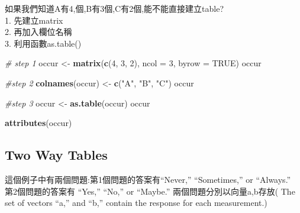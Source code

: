 \documentclass[]{book}
\newenvironment{Shaded}{\begin{snugshade}}{\end{snugshade}}
\newcommand{\CommentTok}[1]{\textcolor[rgb]{0.56,0.35,0.01}{\textit{#1}}}
\newcommand{\DataTypeTok}[1]{\textcolor[rgb]{0.13,0.29,0.53}{#1}}
\newcommand{\DecValTok}[1]{\textcolor[rgb]{0.00,0.00,0.81}{#1}}
\newcommand{\KeywordTok}[1]{\textcolor[rgb]{0.13,0.29,0.53}{\textbf{#1}}}
\newcommand{\NormalTok}[1]{#1}
\newcommand{\OtherTok}[1]{\textcolor[rgb]{0.56,0.35,0.01}{#1}}
\newcommand{\StringTok}[1]{\textcolor[rgb]{0.31,0.60,0.02}{#1}}
\theoremstyle{definition}
\theoremstyle{definition}
\theoremstyle{definition}
\theoremstyle{remark}
\begin{document}
如果我們知道A有4,個,B有3個,C有2個,能不能直接建立table?\\
1. 先建立matrix\\
2. 再加入欄位名稱\\
3. 利用函數as.table()

\begin{Shaded}
\begin{Highlighting}[]
\CommentTok{# step 1}
\NormalTok{occur <-}\StringTok{ }\KeywordTok{matrix}\NormalTok{(}\KeywordTok{c}\NormalTok{(}\DecValTok{4}\NormalTok{, }\DecValTok{3}\NormalTok{, }\DecValTok{2}\NormalTok{), }\DataTypeTok{ncol =} \DecValTok{3}\NormalTok{, }\DataTypeTok{byrow =} \OtherTok{TRUE}\NormalTok{)}
\NormalTok{occur}
\end{Highlighting}
\end{Shaded}

\begin{Shaded}
\begin{Highlighting}[]
\CommentTok{#step 2}
\KeywordTok{colnames}\NormalTok{(occur) <-}\StringTok{ }\KeywordTok{c}\NormalTok{(}\StringTok{"A"}\NormalTok{, }\StringTok{"B"}\NormalTok{, }\StringTok{"C"}\NormalTok{)}
\NormalTok{occur}
\end{Highlighting}
\end{Shaded}

\begin{Shaded}
\begin{Highlighting}[]
\CommentTok{#step 3}
\NormalTok{occur <-}\StringTok{ }\KeywordTok{as.table}\NormalTok{(occur)}
\NormalTok{occur}
\end{Highlighting}
\end{Shaded}

\begin{Shaded}
\begin{Highlighting}[]
\KeywordTok{attributes}\NormalTok{(occur)}
\end{Highlighting}
\end{Shaded}

\hypertarget{two-way-tables}{%
\subsection{Two Way Tables}\label{two-way-tables}}

這個例子中有兩個問題:第1個問題的答案有``Never,'' ``Sometimes,'' or
``Always.''\\
第2個問題的答案有 ``Yes,'' ``No,'' or ``Maybe.''
兩個問題分別以向量a,b存放( The set of vectors ``a,'' and ``b,'' contain
the response for each measurement.)
\end{document}
